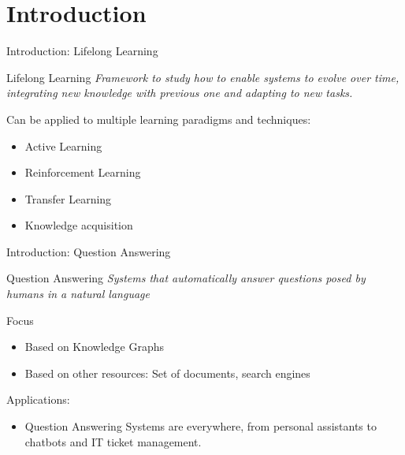 \documentclass{beamer}
\begin{document}
\section{Introduction}
\begin{frame}{Introduction: Lifelong Learning}
  \begin{block}{Lifelong Learning}
    \vspace{0.2cm}
    \textit{Framework to study how to enable systems to evolve over time, integrating new knowledge with previous one and adapting to new tasks.} \par

    Can be applied to multiple learning paradigms and techniques:
    \begin{itemize}
      \item Active Learning
      \item Reinforcement Learning
      \item Transfer Learning
      \item Knowledge acquisition
    \end{itemize}
  \end{block}
\end{frame}

\begin{frame}{Introduction: Question Answering}
  \begin{block}{Question Answering}
    \vspace{0.2cm}
    \textit{Systems that automatically answer questions posed by humans in a natural language} \\
    \begin{alertblock}{Focus}
      \begin{itemize}
        \item Based on Knowledge Graphs
        \item Based on other resources: Set of documents, search engines
      \end{itemize}
    \end{alertblock}
    Applications:
    \begin{itemize}
      \item Question Answering Systems are everywhere, from personal assistants to chatbots and IT ticket management.
    \end{itemize}
  \end{block}
\end{frame}

\end{document}

